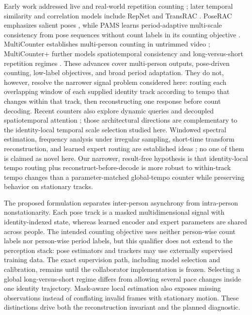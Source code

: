 Early work addressed live and real-world repetition counting
\cite{levy2015live,runia2018realworld}; later temporal similarity and correlation
models include RepNet and TransRAC
\cite{dwibedi2020repnet,hu2022transrac}. PoseRAC emphasizes salient poses
\cite{yao2025poserac}, while PAMS learns period-adaptive multi-scale consistency
from pose sequences without count labels in its counting objective
\cite{gao2026pams}. MultiCounter establishes multi-person counting in
untrimmed video \cite{tang2024multicounter}; MultiCounter+ further models
spatiotemporal consistency and long-versus-short repetition regimes
\cite{tang2026multicounterplus}. These advances cover multi-person outputs,
pose-driven counting, low-label objectives, and broad period adaptation. They
do not, however, resolve the narrower signal problem considered here: routing
each overlapping window of each supplied identity track according to tempo
that changes within that track, then reconstructing one response before count
decoding. Recent counters also explore dynamic queries and decoupled
spatiotemporal attention \cite{ma2026detrc,wang2026d2stx}; those architectural
directions are complementary to the identity-local temporal scale selection
studied here. Windowed spectral estimation, frequency analysis under irregular
sampling, short-time transform reconstruction, and learned expert routing are established
ideas \cite{welch1967fft,lomb1976unequal,griffin1984stft,shazeer2017moe}; no one
of them is claimed as novel here. Our narrower, result-free hypothesis is that
identity-local tempo routing plus reconstruct-before-decode is more robust to
within-track tempo changes than a parameter-matched global-tempo counter while
preserving behavior on stationary tracks.

The proposed formulation separates inter-person asynchrony from intra-person
nonstationarity. Each pose track is a masked multidimensional signal with
identity-indexed state, whereas learned encoder and expert parameters are
shared across people. The intended counting objective uses neither person-wise
count labels nor person-wise period labels, but this qualifier does not extend
to the perception stack: pose estimators and trackers may use externally
supervised training data. The exact supervision path, including model
selection and calibration, remains  until
the collaborator implementation is frozen. Selecting a global long-versus-short
regime differs from allowing several pace changes inside one identity
trajectory. Mask-aware local estimation also exposes missing observations
instead of conflating invalid frames with stationary motion. These distinctions
drive both the reconstruction invariant and the planned diagnostic.

